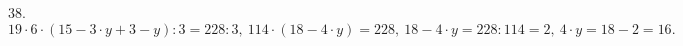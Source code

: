 38. $19\cdot6\cdot(15-3\cdot y+3-y):3=228:3,\ 114\cdot(18-4\cdot y)=228,\ 18-4\cdot y=228:114=2,\ 4\cdot y=18-2=16.$\\
